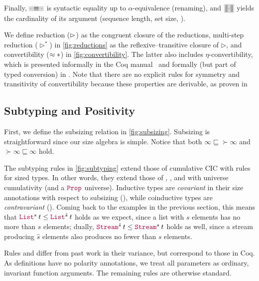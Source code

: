 Finally, $\new{\ph \equiv \ph}$ is syntactic equality up to $\alpha$-equivalence (renaming),
and $\new{\norm{\ph}}$ yields the cardinality of its argument (\eg sequence length, set size, \etc).

We define reduction ($\mathrel{\rhd}$) as the congruent closure of the reductions,
multi-step reduction ($\rhd^*$) in \autoref{fig:reductions} as the reflexive--transitive closure of $\rhd$,
and convertibility ($\mathrel{\approx}*$) in \autoref{fig:convertibility}.
The latter also includes $\eta$-convertibility,
which is presented informally in the Coq manual~\citep{coq} and formally (but part of typed conversion) in \citet{conversion}.
Note that there are no explicit rules for symmetry and transitivity of convertibility
because these properties are derivable, as proven in

\subsection{Subtyping and Positivity}\label{subsec:typing:subtyping}



First, we define the subsizing relation in \autoref{fig:subsizing}.
Subsizing is straightforward since our size algebra is simple.
Notice that both $\infty \sqsubseteq \succ{\infty}$ and $\succ{\infty} \sqsubseteq \infty$ hold.



The subtyping rules in \autoref{fig:subtyping} extend those of cumulative CIC with rules for sized \coinductive types.
In other words, they extend those of \CIChat, \CIChatminus, and \CChatomega with universe cumulativity (and a $\Prop$ universe).
Inductive types are \emph{covariant} in their size annotations with respect to subsizing (),
while coinductive types are \emph{contravariant} ().
Coming back to the examples in the previous section, this means that
$\app{\List^{s}}{t} \leq \app{\List^{\hat{s}}}{t}$ holds as we expect,
since a list with $s$ elements has no more than $\hat{s}$ elements;
dually, $\app{\Stream^{\hat{s}}}{t} \leq \app{\Stream^{s}}{t}$ holds as well,
since a stream producing $\hat{s}$ elements also produces no fewer than $s$ elements.

Rules  and  differ from past work in their variance, but correspond to those in Coq.
As \coinductive definitions have no polarity annotations,
we treat all parameters as ordinary, invariant function arguments.
The remaining rules are otherwise standard.

